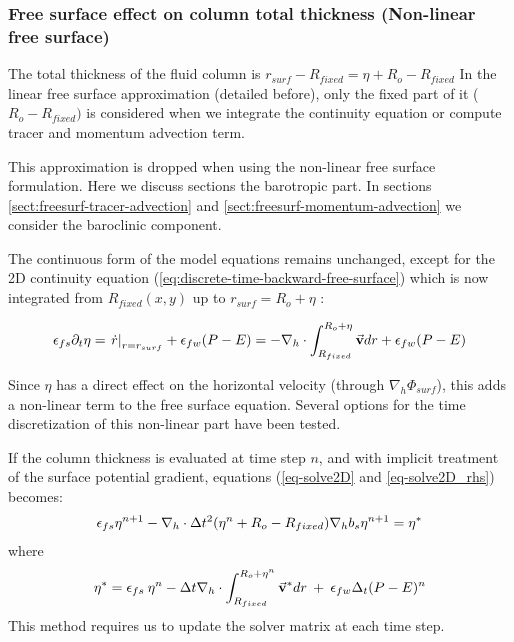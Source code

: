\subsubsection{Free surface effect on column total thickness
(Non-linear free surface)}

The total thickness of the fluid column is $r_{surf} - R_{fixed} =
\eta + R_o - R_{fixed}$ In the linear free surface approximation
(detailed before), only the fixed part of it ($R_o - R_{fixed})$ is
considered when we integrate the continuity equation or compute tracer
and momentum advection term.

This approximation is dropped when using the non-linear free surface
formulation.  Here we discuss sections the barotropic part. In
sections \ref{sect:freesurf-tracer-advection} and
\ref{sect:freesurf-momentum-advection} we consider the baroclinic
component.


The continuous form of the model equations remains unchanged, except
for the 2D continuity equation (\ref{eq:discrete-time-backward-free-surface}) which is now
integrated from $R_{fixed}(x,y)$ up to $r_{surf}=R_o+\eta$ :

\begin{displaymath}
\epsilon_{fs} \partial_t \eta =
\left. \dot{r} \right|_{r=r_{surf}} + \epsilon_{fw} (P-E) =
- {\bf \nabla}_h \cdot \int_{R_{fixed}}^{R_o+\eta} \vec{\bf v} dr
+ \epsilon_{fw} (P-E)
\end{displaymath}

Since $\eta$ has a direct effect on the horizontal velocity (through
$\nabla_h \Phi_{surf}$), this adds a non-linear term to the free
surface equation. Several options for the time discretization of this
non-linear part have been tested.

If the column thickness is evaluated at time step $n$, and with
implicit treatment of the surface potential gradient, equations
(\ref{eq-solve2D} and \ref{eq-solve2D_rhs}) becomes:
\begin{eqnarray*}
\epsilon_{fs} {\eta}^{n+1} -
{\bf \nabla}_h \cdot \Delta t^2 (\eta^{n}+R_o-R_{fixed})
{\bf \nabla}_h b_s {\eta}^{n+1}
= {\eta}^*
\end{eqnarray*}
where
\begin{eqnarray*}
{\eta}^* = \epsilon_{fs} \: {\eta}^{n} -
\Delta t {\bf \nabla}_h \cdot \int_{R_{fixed}}^{R_o+\eta^n} \vec{\bf v}^* dr
\: + \: \epsilon_{fw} \Delta_t (P-E)^{n}
\end{eqnarray*} 
This method requires us to update the solver matrix at each time step.

